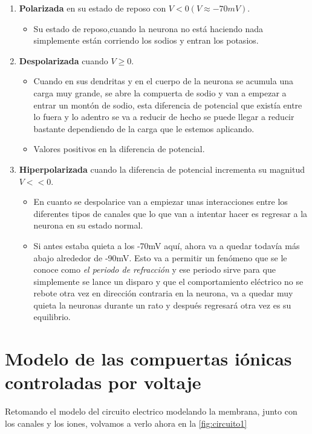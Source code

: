 \begin{enumerate}
 \item \textbf{Polarizada} en su estado de reposo con \(V < 0 ( V \approx -70mV )\).
 \begin{itemize}
  \item Su estado de reposo,cuando la neurona no está haciendo nada simplemente están corriendo los sodios y entran los potasios.
 \end{itemize}
 \item \textbf{Despolarizada} cuando \(V \geq 0\).
 \begin{itemize}
  \item Cuando en sus dendritas y en el cuerpo de la neurona se acumula una carga muy grande, se abre la compuerta de sodio y van a empezar a entrar un montón de sodio, esta diferencia de potencial que existía entre lo fuera y lo adentro se va a reducir de hecho se puede llegar a reducir bastante dependiendo de la carga que le estemos aplicando.
  \item Valores positivos en la diferencia de potencial.    
 \end{itemize}
 \item \textbf{Hiperpolarizada} cuando la diferencia de potencial incrementa su magnitud \(V << 0\).
 \begin{itemize}
 \item En cuanto se despolarice van a empiezar unas interacciones  entre los diferentes tipos de canales que lo que van a intentar hacer es regresar a la neurona en su estado normal.
 \item Si antes estaba quieta a los -70mV aquí, ahora va a quedar todavía más abajo alrededor de -90mV. Esto va a permitir un fenómeno que se le conoce como \emph{el periodo de refracción} y ese periodo sirve para que simplemente se lance un disparo y que el comportamiento eléctrico no se rebote otra vez en dirección contraria en la neurona, va a quedar muy quieta la neuronas durante un rato y después regresará otra vez es su equilibrio. 
 \end{itemize}

\end{enumerate}
 
\section{Modelo de las compuertas iónicas controladas por voltaje}

Retomando el modelo del circuito electrico modelando la membrana, junto con los canales y los iones, volvamos a verlo ahora en la \ref{fig:circuito1}

